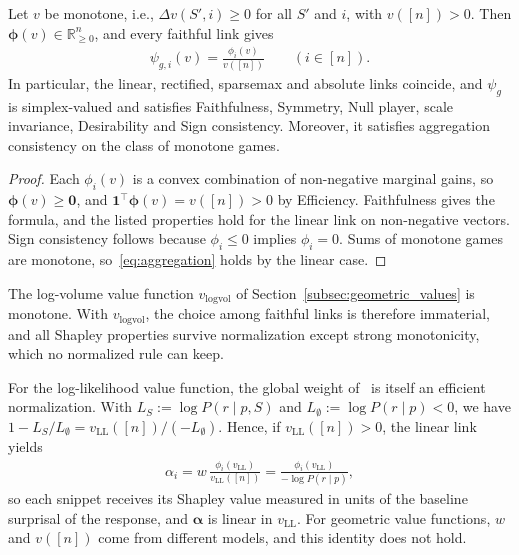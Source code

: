 \begin{theorem}\label{thm:monotone_links}
Let $v$ be monotone, i.e., $\Delta v(S', i) \ge 0$ for all $S'$ and $i$, with $v([n]) > 0$. Then $\boldsymbol{\phi}(v) \in \mathbb{R}^n_{\ge 0}$, and every faithful link gives
\begin{align}
    \psi_{g,i}(v) = \frac{\phi_i(v)}{v([n])} \qquad (i \in [n]).
\end{align}
In particular, the linear, rectified, sparsemax and absolute links coincide, and $\psi_g$ is simplex-valued and satisfies Faithfulness, Symmetry, Null player, scale invariance, Desirability and Sign consistency. Moreover, it satisfies aggregation consistency on the class of monotone games.
\end{theorem}

\begin{proof}
Each $\phi_i(v)$ is a convex combination of non-negative marginal gains, so $\boldsymbol{\phi}(v) \ge \mathbf{0}$, and $\mathbf{1}^\top \boldsymbol{\phi}(v) = v([n]) > 0$ by Efficiency. Faithfulness gives the formula, and the listed properties hold for the linear link on non-negative vectors. Sign consistency follows because $\phi_i \le 0$ implies $\phi_i = 0$. Sums of monotone games are monotone, so~\eqref{eq:aggregation} holds by the linear case.
\end{proof}

The log-volume value function $v_{\text{logvol}}$ of Section~\ref{subsec:geometric_values} is monotone. With $v_{\text{logvol}}$, the choice among faithful links is therefore immaterial, and all Shapley properties survive normalization except strong monotonicity, which no normalized rule can keep.

\begin{remark}\label{rem:linear_llh}
For the log-likelihood value function, the global weight of~\cite{nematov2025source} is itself an efficient normalization. With $L_S := \log P(r \mid p, S)$ and $L_\emptyset := \log P(r \mid p) < 0$, we have $1 - L_S / L_\emptyset = v_{\text{LL}}([n]) / (-L_\emptyset)$. Hence, if $v_{\text{LL}}([n]) > 0$, the linear link yields
\begin{align}
    \alpha_i = w \, \frac{\phi_i(v_{\text{LL}})}{v_{\text{LL}}([n])} = \frac{\phi_i(v_{\text{LL}})}{-\log P(r \mid p)},
\end{align}
so each snippet receives its Shapley value measured in units of the baseline surprisal of the response, and $\boldsymbol{\alpha}$ is linear in $v_{\text{LL}}$. For geometric value functions, $w$ and $v([n])$ come from different models, and this identity does not hold.
\end{remark}

